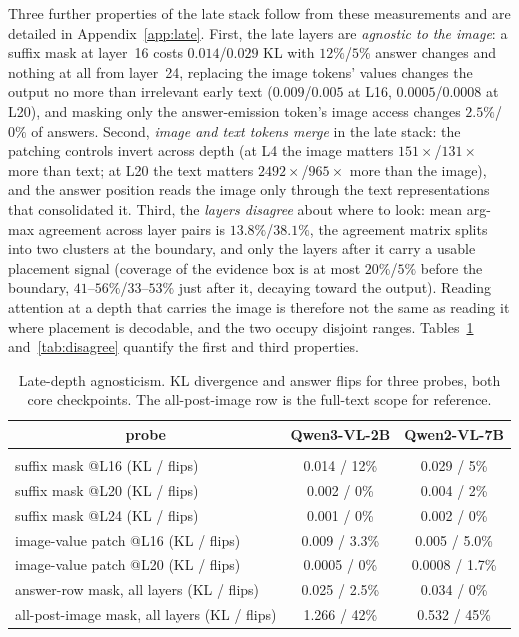 \documentclass{article} %
\begin{document}
Three further properties of the late stack follow from these measurements and are detailed in Appendix~\ref{app:late}. First, the late layers are \emph{agnostic to the image}: a suffix mask at layer~16 costs $0.014$/$0.029$ KL with $12\%$/$5\%$ answer changes and nothing at all from layer~24, replacing the image tokens' values changes the output no more than irrelevant early text ($0.009$/$0.005$ at L16, $0.0005$/$0.0008$ at L20), and masking only the answer-emission token's image access changes $2.5\%$/$0\%$ of answers. Second, \emph{image and text tokens merge} in the late stack: the patching controls invert across depth (at L4 the image matters $151\times$/$131\times$ more than text; at L20 the text matters $2492\times$/$965\times$ more than the image), and the answer position reads the image only through the text representations that consolidated it. Third, the \emph{layers disagree} about where to look: mean arg-max agreement across layer pairs is $13.8\%$/$38.1\%$, the agreement matrix splits into two clusters at the boundary, and only the layers after it carry a usable placement signal (coverage of the evidence box is at most $20\%$/$5\%$ before the boundary, $41$--$56\%$/$33$--$53\%$ just after it, decaying toward the output). Reading attention at a depth that carries the image is therefore not the same as reading it where placement is decodable, and the two occupy disjoint ranges. Tables~\ref{tab:agnostic} and~\ref{tab:disagree} quantify the first and third properties.

\begin{table}[t]
\caption{Late-depth agnosticism. KL divergence and answer flips for three probes, both core checkpoints. The
all-post-image row is the full-text scope for reference.}
\label{tab:agnostic}
\begin{center}
\small
\begin{tabular}{lcc}
\multicolumn{1}{c}{\bf probe} &\multicolumn{1}{c}{\bf Qwen3-VL-2B} &\multicolumn{1}{c}{\bf Qwen2-VL-7B}
\\ \hline \\
suffix mask @L16 (KL / flips) & 0.014 / 12\% & 0.029 / 5\%\\
suffix mask @L20 (KL / flips) & 0.002 / 0\% & 0.004 / 2\%\\
suffix mask @L24 (KL / flips) & 0.001 / 0\% & 0.002 / 0\%\\
image-value patch @L16 (KL / flips) & 0.009 / 3.3\% & 0.005 / 5.0\%\\
image-value patch @L20 (KL / flips) & 0.0005 / 0\% & 0.0008 / 1.7\%\\
answer-row mask, all layers (KL / flips) & 0.025 / 2.5\% & 0.034 / 0\%\\
all-post-image mask, all layers (KL / flips) & 1.266 / 42\% & 0.532 / 45\%\\
\end{tabular}
\end{center}
\end{table}
\end{document}
